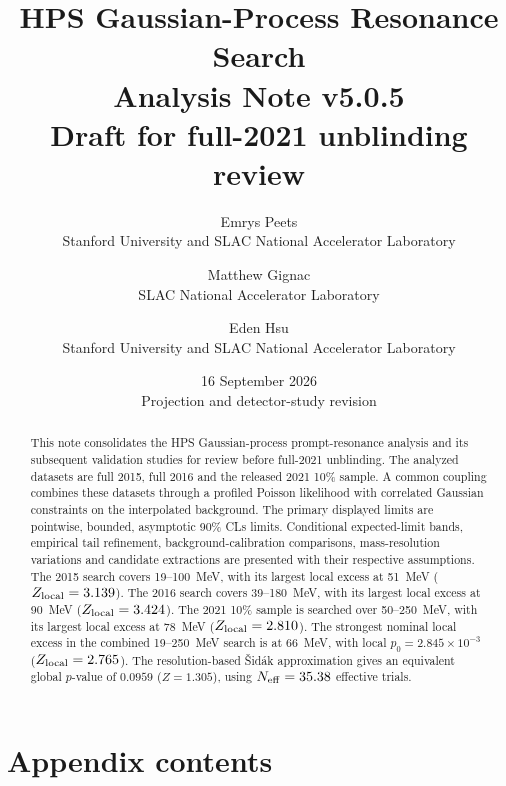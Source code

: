\documentclass[11pt]{article}
\title{HPS Gaussian-Process Resonance Search\\[0.5em]
\large Analysis Note v5.0.5\\Draft for full-2021 unblinding review}
\author{Emrys Peets\\Stanford University and SLAC National Accelerator Laboratory
\and Matthew Gignac\\SLAC National Accelerator Laboratory
\and Eden Hsu\\Stanford University and SLAC National Accelerator Laboratory}
\date{16 September 2026\\\normalsize Projection and detector-study revision}
\makeatletter
\def\CLs{CLs}%
\newcommand{\CLs}{CL$_\mathrm{s}$}
\newcommand{\startappendixcontents}{%
\let\vfiveoriginaladdcontentsline\addcontentsline
\renewcommand{\addcontentsline}[3]{%
\vfiveoriginaladdcontentsline{##1}{##2}{##3}%
\def\vfivefirst{##1}\def\vfivetoc{toc}%
\ifx\vfivefirst\vfivetoc\vfiveoriginaladdcontentsline{apc}{##2}{##3}\fi}}
\newcommand{\appendixcontents}{\section*{Appendix contents}{\setcounter{tocdepth}{2}\@starttoc{apc}}}
\makeatother
\begin{document}
\maketitle
\begin{abstract}
This note consolidates the HPS Gaussian-process prompt-resonance analysis and
its subsequent validation studies for review before full-2021 unblinding.
The analyzed datasets are full 2015, full 2016 and the released 2021 10\% sample.
A common coupling combines these datasets through a profiled Poisson
likelihood with correlated Gaussian constraints on the interpolated background.
The primary displayed limits are pointwise, bounded, asymptotic 90\% \CLs{}
limits. Conditional expected-limit bands, empirical tail refinement,
background-calibration comparisons, mass-resolution variations and candidate
extractions are presented with their respective assumptions.
The 2015 search covers 19--100~MeV, with its largest local excess at
51~MeV ($Z_{\rm local}=3.139$). The 2016 search covers 39--180~MeV,
with its largest local excess at 90~MeV ($Z_{\rm local}=3.424$).
The 2021 10\% sample is searched over 50--250~MeV, with its largest
local excess at 78~MeV ($Z_{\rm local}=2.810$).
The strongest nominal local excess in the combined 19--250~MeV search is at 66~MeV,
with local $p_0=2.845\times10^{-3}$ ($Z_{\rm local}=2.765$).
The resolution-based \v{S}id\'ak approximation gives an equivalent global
$p$-value of $0.0959$ ($Z=1.305$), using $N_{\rm eff}=35.38$ effective trials.
\end{abstract}
\clearpage{\small\tableofcontents}
\clearpage

\FloatBarrier\clearpage

\FloatBarrier\clearpage

\FloatBarrier\clearpage



\FloatBarrier\clearpage

\FloatBarrier\clearpage


\FloatBarrier\clearpage

\FloatBarrier\clearpage

\FloatBarrier\clearpage
\appendix
{}
\startappendixcontents

\FloatBarrier\clearpage
{\footnotesize\appendixcontents}
\clearpage

\FloatBarrier\clearpage

\FloatBarrier\clearpage

\FloatBarrier\clearpage

\FloatBarrier\clearpage

\FloatBarrier\clearpage

\FloatBarrier\clearpage

\clearpage

\clearpage

\FloatBarrier\clearpage

\FloatBarrier\clearpage

\FloatBarrier\clearpage

\FloatBarrier\clearpage

\FloatBarrier\clearpage

\FloatBarrier\clearpage
\let\addcontentsline\vfiveoriginaladdcontentsline


\end{document}
